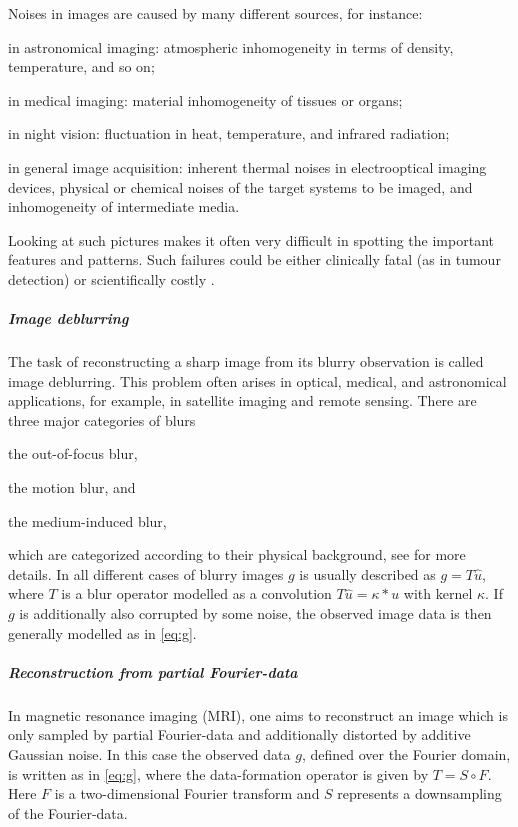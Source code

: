 \documentclass[enabledeprecatedfontcommands,cleardoublepage=empty,headsepline,twoside,11pt,DIV=15,BCOR=12mm,final]{scrartcl}
\begin{document}
Noises in images are caused by many different sources, for instance:
\begin{inparaenum}[(i)]
\item in astronomical imaging: atmospheric inhomogeneity in terms of density, temperature, and so on;
\item in medical imaging: material inhomogeneity of tissues or organs;
\item in night vision: fluctuation in heat, temperature, and infrared radiation;
\item in general image acquisition: inherent thermal noises in electrooptical imaging devices, physical or chemical noises of the target systems to be imaged, and inhomogeneity of intermediate media.
\end{inparaenum}


Looking at such pictures makes it often very difficult in spotting the important features and patterns. Such failures could be either clinically fatal (as in tumour detection) or scientifically costly \cite{ChanShen:05}.


\subparagraph{Image deblurring}

The task of reconstructing a sharp image from its blurry observation is called image deblurring. This problem often arises in optical, medical, and astronomical applications, for example, in satellite imaging and remote sensing. There are three major categories of blurs \begin{inparaenum}[(i)]
\item the out-of-focus blur,
\item the motion blur, and 
\item the medium-induced blur, 
\end{inparaenum}
which are categorized according to their physical background, see \cite{ChanShen:05} for more details. In all different cases of blurry images $g$ is usually described as $g =T\hat{u}$, where $T$ is a blur operator modelled as a convolution $T\hat{u} = \kappa * u$ with kernel $\kappa$. If $g$ is additionally also corrupted by some noise, the observed image data is then generally modelled as in \eqref{eq:g}.

\subparagraph{Reconstruction from partial Fourier-data}

In magnetic resonance imaging (MRI), one aims to reconstruct an image which is only sampled by partial Fourier-data and additionally distorted by additive Gaussian noise. In this case the observed data $g$, defined over the Fourier domain, is written as in \eqref{eq:g}, where the data-formation operator is given by $T = S \circ F$. Here $F$ is a two-dimensional Fourier transform and $S$ represents a downsampling of the Fourier-data. \\
\end{document}
